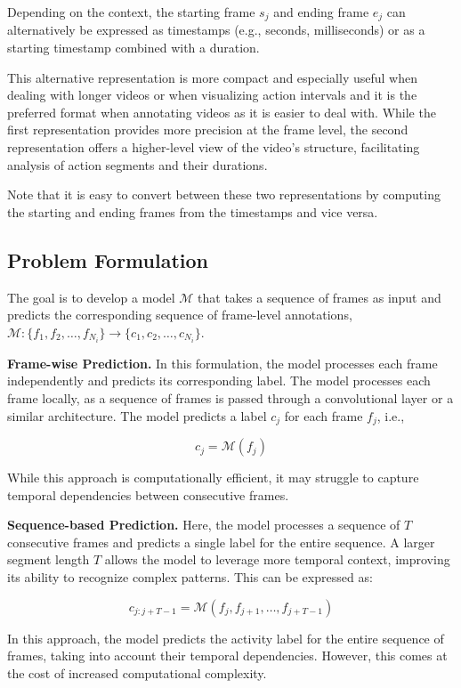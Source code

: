 Depending on the context, the starting frame $s_j$ and ending frame $e_j$ can alternatively be expressed as timestamps (e.g., seconds, milliseconds) or as a starting timestamp combined with a duration. 

This alternative representation is more compact and especially useful when dealing with longer videos or when visualizing action intervals and it is the preferred format when annotating videos as it is easier to deal with. While the first representation provides more precision at the frame level, the second representation offers a higher-level view of the video’s structure, facilitating analysis of action segments and their durations.

Note that it is easy to convert between these two representations by computing the starting and ending frames from the timestamps and vice versa.

\subsection{Problem Formulation}
The goal is to develop a model $\mathcal{M}$ that takes a sequence of frames as input and predicts the corresponding sequence of frame-level annotations, $\mathcal{M}: \{f_1, f_2, \dots, f_{N_i}\} \rightarrow \{c_1, c_2, \dots, c_{N_i}\}$.

\noindent\textbf{Frame-wise Prediction.}  
In this formulation, the model processes each frame independently and predicts its corresponding label. The model processes each frame locally, as a sequence of frames is passed through a convolutional layer or a similar architecture. The model predicts a label $c_j$ for each frame $f_j$, i.e.,

\[
c_j = \mathcal{M}(f_j)
\]

While this approach is computationally efficient, it may struggle to capture temporal dependencies between consecutive frames.

\noindent\textbf{Sequence-based Prediction.}  
Here, the model processes a sequence of $T$ consecutive frames and predicts a single label for the entire sequence. A larger segment length $T$ allows the model to leverage more temporal context, improving its ability to recognize complex patterns. This can be expressed as:

\[
c_{j:j+T-1} = \mathcal{M}(f_j, f_{j+1}, \dots, f_{j+T-1})
\]

In this approach, the model predicts the activity label for the entire sequence of frames, taking into account their temporal dependencies. However, this comes at the cost of increased computational complexity.

